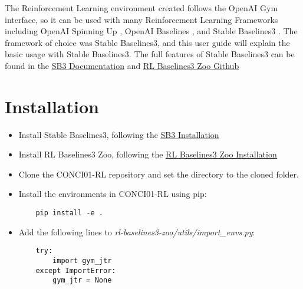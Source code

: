 
The Reinforcement Learning environment created follows the OpenAI Gym interface, so it can be used with many Reinforcement Learning Frameworks including OpenAI Spinning Up \cite{SpinningUp2018}, OpenAI Baselines \cite{baselines}, and Stable Baselines3 \cite{stable-baselines3}. The framework of choice was Stable Baselines3, and this user guide will explain the basic usage with Stable Baselines3. The full features of Stable Baselines3 can be found in the \href{https://stable-baselines3.readthedocs.io/en/master/index.html}{\underline{SB3 Documentation}} and \href{https://github.com/DLR-RM/rl-baselines3-zoo}{\underline{RL Baselines3 Zoo Github}}

\section{Installation}

\begin{itemize}
    \item Install Stable Baselines3, following the \href{https://stable-baselines3.readthedocs.io/en/master/guide/install.html}{\underline{SB3 Installation}}
    \item Install RL Baselines3 Zoo, following the \href{https://stable-baselines3.readthedocs.io/en/master/guide/rl_zoo.html}{\underline{RL Baselines3 Zoo Installation}}
    \item Clone the CONCI01-RL repository and set the directory to the cloned folder.
    \item Install the environments in CONCI01-RL using pip:
    \begin{lstlisting}
    pip install -e .
    \end{lstlisting}
    \item Add the following lines to \textit{rl-baselines3-zoo/utils/import\_envs.py}:
    \begin{lstlisting}
    try:
        import gym_jtr
    except ImportError:
        gym_jtr = None
    \end{lstlisting}   
\end{itemize}

